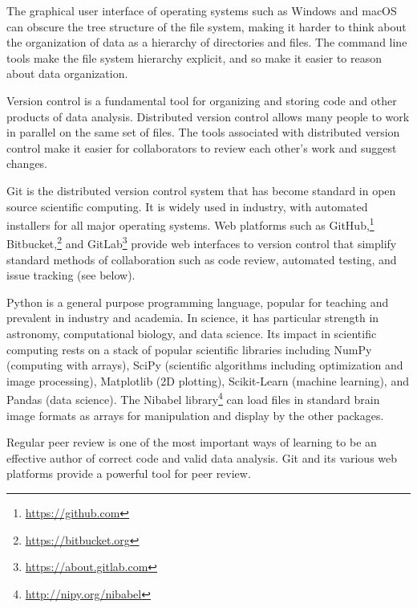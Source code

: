 The graphical user interface of operating systems such as Windows and macOS
can obscure the tree structure of the file system, making it harder to think
about the organization of data as a hierarchy of directories and files.  The
command line tools make the file system hierarchy explicit, and so make it
easier to reason about data organization.


Version control is a fundamental tool for organizing and storing code and
other products of data analysis.
Distributed version control allows many people to work in parallel on the
same set of files.
The tools associated with distributed version control make it easier for
collaborators to review each other's work and suggest changes.

Git is the distributed version control system that has become standard in
open source scientific computing. It is widely used in industry, with automated
installers for all major operating systems.
Web platforms such as GitHub,\footnote{\url{https://github.com}}
Bitbucket,\footnote{\url{https://bitbucket.org}} and
GitLab\footnote{\url{https://about.gitlab.com}} provide web interfaces to
version control that simplify standard methods of collaboration such as code
review, automated testing, and issue tracking (see below).

Python is a general purpose programming language,
popular for teaching and prevalent in industry and academia.
In science, it has particular strength in
astronomy, computational biology, and data science.
Its impact in scientific computing rests on a stack of popular scientific
libraries including NumPy (computing with arrays), SciPy (scientific
algorithms including optimization and image processing), Matplotlib (2D
plotting), Scikit-Learn (machine learning), and Pandas (data science).  The
Nibabel library\footnote{\url{http://nipy.org/nibabel}\label{nibabel}} can
load files in standard brain image formats as arrays for manipulation and
display by the other packages.

Regular peer review is one of the most important ways of learning
to be an effective author of correct code and valid data analysis.  Git and its
various web platforms provide a powerful tool for peer review.

